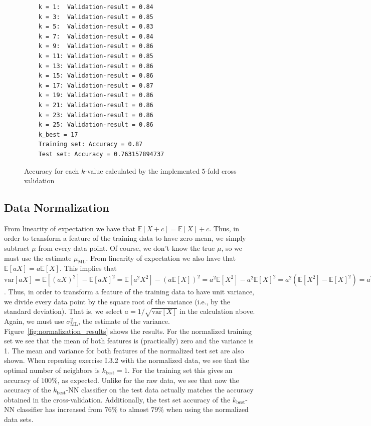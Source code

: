 \documentclass[a4paper]{article}
\begin{document}
\begin{figure}[H]
	\begin{lstlisting}
	k = 1:  Validation-result = 0.84
	k = 3:  Validation-result = 0.85
	k = 5:  Validation-result = 0.83
	k = 7:  Validation-result = 0.84
	k = 9:  Validation-result = 0.86
	k = 11: Validation-result = 0.85
	k = 13: Validation-result = 0.86
	k = 15: Validation-result = 0.86
	k = 17: Validation-result = 0.87
	k = 19: Validation-result = 0.86
	k = 21: Validation-result = 0.86
	k = 23: Validation-result = 0.86
	k = 25: Validation-result = 0.86
	k_best = 17
	Training set: Accuracy = 0.87
	Test set: Accuracy = 0.763157894737
	\end{lstlisting}
	\caption{Accuracy for each $k$-value calculated by the implemented 5-fold cross validation}
	\label{fig:5-fold_results}
\end{figure}

\subsection{Data Normalization}
From linearity of expectation we have that $\mathbb{E}[X + c] = \mathbb{E}[X] + c$. Thus, in order to transform a feature of the training data to have zero mean, we simply subtract $\mu$ from every data point. Of course, we don't know the true $\mu$, so we must use the estimate $\mu_{\text{ML}}$. From linearity of expectation we also have that $\mathbb{E}[aX] = a\mathbb{E}[X]$. This implies that $\text{var}[aX] = \mathbb{E}[(aX)^2] - \mathbb{E}[aX]^2 = \mathbb{E}[a^2X^2] - (a\mathbb{E}[X])^2 = a^2\mathbb{E}[X^2] - a^2\mathbb{E}[X]^2 = a^2(\mathbb{E}[X^2] - \mathbb{E}[X]^2) = a^2\text{var}[X]$. Thus, in order to transform a feature of the training data to have unit variance, we divide every data point by the square root of the variance (i.e., by the standard deviation). That is, we select $a = 1 / \sqrt{\text{var}[X]}$ in the calculation above. Again, we must use $\sigma^2_{\text{ML}}$, the estimate of the variance.\\

Figure~\ref{fig:normalization_results} shows the results. For the normalized training set we see that the mean of both features is (practically) zero and the variance is 1. The mean and variance for both features of the normalized test set are also shown. When repeating exercise I.3.2 with the normalized data, we see that the optimal number of neighbors is $k_{\text{best}} = 1$. For the training set this gives an accuracy of $100\%$, as expected. Unlike for the raw data, we see that now the accuracy of the $k_{\text{best}}$-NN classifier on the test data actually matches the accuracy obtained in the cross-validation. Additionally, the test set accuracy of the $k_{\text{best}}$-NN classifier has increased from $76\%$ to almost $79\%$ when using the normalized data sets.
\end{document}
